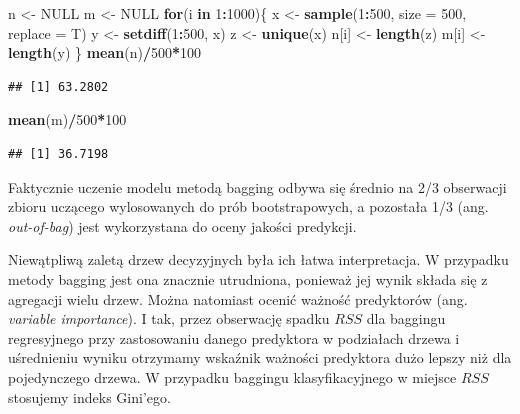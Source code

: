 \documentclass[
]{book}
\newenvironment{Shaded}{\begin{snugshade}}{\end{snugshade}}
\newcommand{\AttributeTok}[1]{\textcolor[rgb]{0.13,0.29,0.53}{#1}}
\newcommand{\ConstantTok}[1]{\textcolor[rgb]{0.56,0.35,0.01}{#1}}
\newcommand{\ControlFlowTok}[1]{\textcolor[rgb]{0.13,0.29,0.53}{\textbf{#1}}}
\newcommand{\DecValTok}[1]{\textcolor[rgb]{0.00,0.00,0.81}{#1}}
\newcommand{\FunctionTok}[1]{\textcolor[rgb]{0.13,0.29,0.53}{\textbf{#1}}}
\newcommand{\NormalTok}[1]{#1}
\newcommand{\OtherTok}[1]{\textcolor[rgb]{0.56,0.35,0.01}{#1}}
\newcommand{\SpecialCharTok}[1]{\textcolor[rgb]{0.81,0.36,0.00}{\textbf{#1}}}
\theoremstyle{plain}
\theoremstyle{definition}
\theoremstyle{definition}
\theoremstyle{definition}
\theoremstyle{definition}
\theoremstyle{definition}
\theoremstyle{remark}
\begin{document}
\begin{Shaded}
\begin{Highlighting}[]
\NormalTok{n }\OtherTok{\textless{}{-}} \ConstantTok{NULL}
\NormalTok{m }\OtherTok{\textless{}{-}} \ConstantTok{NULL}
\ControlFlowTok{for}\NormalTok{(i }\ControlFlowTok{in} \DecValTok{1}\SpecialCharTok{:}\DecValTok{1000}\NormalTok{)\{}
\NormalTok{    x }\OtherTok{\textless{}{-}} \FunctionTok{sample}\NormalTok{(}\DecValTok{1}\SpecialCharTok{:}\DecValTok{500}\NormalTok{, }\AttributeTok{size =} \DecValTok{500}\NormalTok{, }\AttributeTok{replace =}\NormalTok{ T)}
\NormalTok{    y }\OtherTok{\textless{}{-}} \FunctionTok{setdiff}\NormalTok{(}\DecValTok{1}\SpecialCharTok{:}\DecValTok{500}\NormalTok{, x)}
\NormalTok{    z }\OtherTok{\textless{}{-}} \FunctionTok{unique}\NormalTok{(x)}
\NormalTok{    n[i] }\OtherTok{\textless{}{-}} \FunctionTok{length}\NormalTok{(z)}
\NormalTok{    m[i] }\OtherTok{\textless{}{-}} \FunctionTok{length}\NormalTok{(y)}
\NormalTok{\}}
\FunctionTok{mean}\NormalTok{(n)}\SpecialCharTok{/}\DecValTok{500}\SpecialCharTok{*}\DecValTok{100}
\end{Highlighting}
\end{Shaded}

\begin{verbatim}
## [1] 63.2802
\end{verbatim}

\begin{Shaded}
\begin{Highlighting}[]
\FunctionTok{mean}\NormalTok{(m)}\SpecialCharTok{/}\DecValTok{500}\SpecialCharTok{*}\DecValTok{100}
\end{Highlighting}
\end{Shaded}

\begin{verbatim}
## [1] 36.7198
\end{verbatim}

Faktycznie uczenie modelu metodą bagging odbywa się średnio na 2/3 obserwacji zbioru uczącego wylosowanych do prób bootstrapowych, a pozostała 1/3 (ang. \emph{out-of-bag}) jest wykorzystana do oceny jakości predykcji.

Niewątpliwą zaletą drzew decyzyjnych była ich łatwa interpretacja. W przypadku metody bagging jest ona znacznie utrudniona, ponieważ jej wynik składa się z agregacji wielu drzew. Można natomiast ocenić ważność predyktorów (ang. \emph{variable importance}). I tak, przez obserwację spadku \(RSS\) dla baggingu regresyjnego przy zastosowaniu danego predyktora w podziałach drzewa i uśrednieniu wyniku otrzymamy wskaźnik ważności predyktora dużo lepszy niż dla pojedynczego drzewa. W przypadku baggingu klasyfikacyjnego w miejsce \(RSS\) stosujemy indeks Gini'ego.
\end{document}
